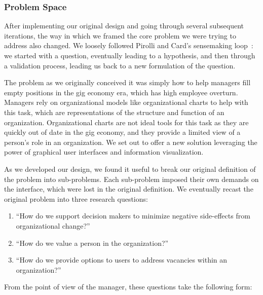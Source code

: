 \documentclass[journal]{vgtc}                %
\begin{document}
\subsubsection{Problem Space}
\label{sec:problem}
After implementing our original design and going through several subsequent iterations, the way in which we framed the core problem we were trying to address also changed. We loosely followed Pirolli and Card's sensemaking loop~\cite{pirolli2005sensemaking}: we started with a question, eventually leading to a hypothesis, and then through a validation process, leading us back to a new formulation of the question.  

The problem as we originally conceived it was simply how to help managers fill empty positions in the gig economy era, which has high employee overturn. Managers rely on organizational models like organizational charts to help with this task, which are representations of the structure and function of an organization. Organizational charts are not ideal tools for this task as they are quickly out of date in the gig economy, and they provide a limited view of a person's role in an organization. We set out to offer a new solution leveraging the power of graphical user interfaces and information visualization. 

As we developed our design, we found it useful to break our original definition of the problem into sub-problems. Each sub-problem imposed their own demands on the interface, which were lost in the original definition. We eventually recast the original problem into three research questions: 

\begin{enumerate}
\item “How do we support decision makers to minimize negative side-effects from organizational change?”
\item “How do we value a person in the organization?”
\item “How do we provide options to users to address vacancies within an organization?”
\end{enumerate}

From the point of view of the manager, these questions take the following form: 
\end{document}
